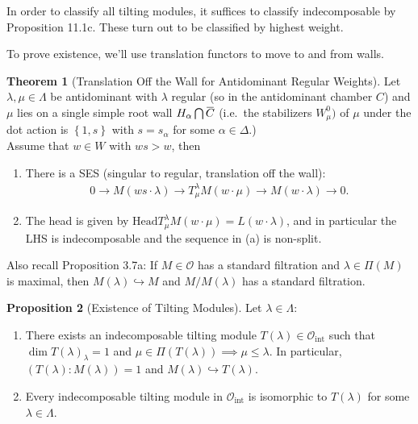 \documentclass[11pt]{scrartcl}
\theoremstyle{definition}
\theoremstyle{theorem}
\newtheorem{theorem}{Theorem}[section]
\newtheorem{proposition}[theorem]{Proposition}
\theoremstyle{proof}
\theoremstyle{definition}
\theoremstyle{break}
\theoremstyle{problem}
\providecommand{\tightlist}{%
  \setlength{\itemsep}{0pt}\setlength{\parskip}{0pt}}
\newcommand{\injects}[0]{\hookrightarrow}
\newcommand{\intersect}[0]{\bigcap}
\newcommand{\OO}[0]{{\mathcal{O}}}
\newcommand{\theset}[1]{\left\{{#1}\right\}}
\renewcommand{\bar}[1]{\mkern 1.5mu\overline{\mkern-1.5mu#1\mkern-1.5mu}\mkern 1.5mu}
\renewcommand{\to}[0]{\longrightarrow}
\begin{document}
In order to classify all tilting modules, it suffices to classify
indecomposable by Proposition 11.1c. These turn out to be classified by
highest weight.

To prove existence, we'll use translation functors to move to and from
walls.

\begin{theorem}[Translation Off the Wall for Antidominant Regular Weights]

Let \(\lambda, \mu \in \Lambda\) be antidominant with \(\lambda\)
regular (so in the antidominant chamber \(C\)) and \(\mu\) lies on a
single simple root wall \(H_\alpha \intersect \bar C\) (i.e.~the
stabilizers \(W_\mu^0)\) of \(\mu\) under the dot action is
\(\theset{1, s}\) with \(s = s_\alpha\) for some
\(\alpha \in \Delta\).)\\
Assume that \(w\in W\) with \(ws > w\), then

\begin{enumerate}
\def\labelenumi{\alph{enumi}.}
\tightlist
\item
  There is a SES (singular to regular, translation off the wall):
  \begin{align*} 0 \to M(ws \cdot \lambda ) \to T_{\mu}^\lambda M(w\cdot \mu) \to M(w\cdot \lambda) \to 0.\end{align*}
\item
  The head is given by
  \(\text{Head} T_{\mu}^\lambda M(w\cdot \mu) = L(w\cdot \lambda)\), and
  in particular the LHS is indecomposable and the sequence in (a) is
  non-split.
\end{enumerate}

\end{theorem}

Also recall Proposition 3.7a: If \(M\in \OO\) has a standard filtration
and \(\lambda \in \Pi(M)\) is maximal, then \(M(\lambda) \injects M\)
and \(M/M(\lambda)\) has a standard filtration.

\begin{proposition}[Existence of  Tilting Modules]

Let \(\lambda \in \Lambda\):

\begin{enumerate}
\def\labelenumi{\alph{enumi}.}
\tightlist
\item
  There exists an indecomposable tilting module
  \(T(\lambda) \in \OO_{\text{int}}\) such that
  \(\dim T(\lambda)_\lambda = 1\) and
  \(\mu \in \Pi(T(\lambda)) \implies \mu \leq \lambda\). In particular,
  \(( T(\lambda): M(\lambda) ) = 1\) and
  \(M(\lambda) \injects T(\lambda)\).
\item
  Every indecomposable tilting module in \(\OO_{\text{int}}\) is
  isomorphic to \(T(\lambda)\) for some \(\lambda \in \Lambda\).
\end{enumerate}

\end{proposition}
\end{document}

